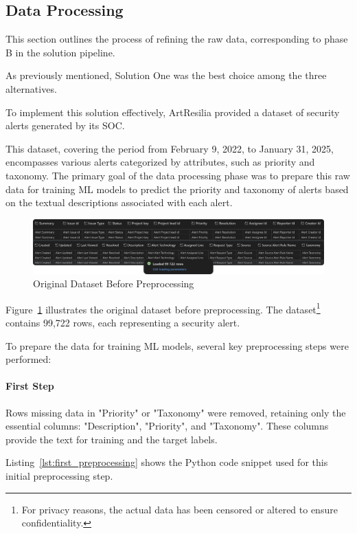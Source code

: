 \subsection{Data Processing}
This section outlines the process of refining the raw data, corresponding to phase B in the solution pipeline.

As previously mentioned, Solution One was the best choice among the three alternatives.

To implement this solution effectively, ArtResilia provided a dataset of security alerts generated by its SOC. 

This dataset, covering the period from February 9, 2022, to January 31, 2025, encompasses various alerts categorized by attributes, such as priority and taxonomy. 
The primary goal of the data processing phase was to prepare this raw data for training ML models to predict the priority and taxonomy of alerts based on the textual descriptions associated with each alert.

\begin{figure}[h!]
    \centering
    \includegraphics[width=\textwidth]{ch3/assets/dataset_original.png}
    \caption{Original Dataset Before Preprocessing}
    \label{fig:dataset_original}
\end{figure}

Figure~\ref{fig:dataset_original} illustrates the original dataset before preprocessing.
The dataset\footnote{For privacy reasons, the actual data has been censored or altered to ensure confidentiality.} contains 99,722 rows, each representing a security alert.

To prepare the data for training ML models, several key preprocessing steps were performed:

\paragraph{First Step}
Rows missing data in "Priority" or "Taxonomy" were removed, retaining only the essential columns: "Description", "Priority", and "Taxonomy". 
These columns provide the text for training and the target labels.

Listing~\ref{lst:first_preprocessing} shows the Python code snippet used for this initial preprocessing step.


